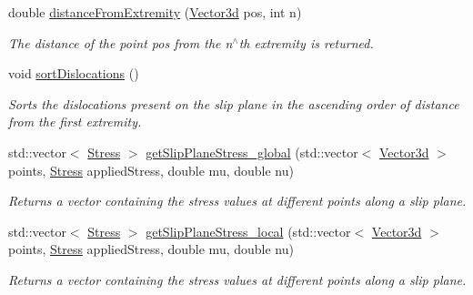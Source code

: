 \begin{DoxyCompactItemize}
double \hyperlink{classSlipPlane_a3523030cccb520b5253a811d062f3ddf}{distance\-From\-Extremity} (\hyperlink{classVector3d}{Vector3d} pos, int n)
\begin{DoxyCompactList}\small\item\em The distance of the point pos from the n$^\wedge$th extremity is returned. \end{DoxyCompactList}\item 
void \hyperlink{classSlipPlane_a7fc607c17e5532aed5e93339dc03b18d}{sort\-Dislocations} ()
\begin{DoxyCompactList}\small\item\em Sorts the dislocations present on the slip plane in the ascending order of distance from the first extremity. \end{DoxyCompactList}\item 
std\-::vector$<$ \hyperlink{classStress}{Stress} $>$ \hyperlink{classSlipPlane_a1cc47e2092a588ff04fd14e9ce9e5906}{get\-Slip\-Plane\-Stress\-\_\-global} (std\-::vector$<$ \hyperlink{classVector3d}{Vector3d} $>$ points, \hyperlink{classStress}{Stress} applied\-Stress, double mu, double nu)
\begin{DoxyCompactList}\small\item\em Returns a vector containing the stress values at different points along a slip plane. \end{DoxyCompactList}\item 
std\-::vector$<$ \hyperlink{classStress}{Stress} $>$ \hyperlink{classSlipPlane_ad86337ca356d72f558468a35024e30bc}{get\-Slip\-Plane\-Stress\-\_\-local} (std\-::vector$<$ \hyperlink{classVector3d}{Vector3d} $>$ points, \hyperlink{classStress}{Stress} applied\-Stress, double mu, double nu)
\begin{DoxyCompactList}\small\item\em Returns a vector containing the stress values at different points along a slip plane. \end{DoxyCompactList}\end{DoxyCompactItemize}
